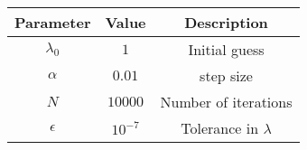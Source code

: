 
\begin{center}
\begin{tabular}{|c|c|c|}
\hline
	\textbf{Parameter}& \textbf{Value}& \textbf{Description}\\ \hline
	$\lambda_0$	&$1$		        &Initial guess\\ \hline
	$\alpha$	&$0.01$	                &step size\\ \hline
	$N$	        &$10000$                &Number of iterations\\ \hline
	$\epsilon$	&$10^{-7}$             &Tolerance in $\lambda$\\ \hline
\end{tabular}
\end{center}
